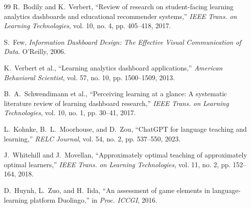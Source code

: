 \documentclass[11pt,a4paper]{article}
\begin{document}
\begin{thebibliography}{99}
R.~Bodily and K.~Verbert, ``Review of research on student-facing learning analytics dashboards and educational recommender systems,'' \emph{IEEE Trans. on Learning Technologies}, vol. 10, no. 4, pp. 405--418, 2017.

S.~Few, \emph{Information Dashboard Design: The Effective Visual Communication of Data}. O'Reilly, 2006.

K.~Verbert et al., ``Learning analytics dashboard applications,'' \emph{American Behavioral Scientist}, vol. 57, no. 10, pp. 1500--1509, 2013.

B.~A.~Schwendimann et al., ``Perceiving learning at a glance: A systematic literature review of learning dashboard research,'' \emph{IEEE Trans. on Learning Technologies}, vol. 10, no. 1, pp. 30--41, 2017.

L.~Kohnke, B.~L.~Moorhouse, and D.~Zou, ``ChatGPT for language teaching and learning,'' \emph{RELC Journal}, vol. 54, no. 2, pp. 537--550, 2023.

J.~Whitehill and J.~Movellan, ``Approximately optimal teaching of approximately optimal learners,'' \emph{IEEE Trans. on Learning Technologies}, vol. 11, no. 2, pp. 152--164, 2018.

D.~Huynh, L.~Zuo, and H.~Iida, ``An assessment of game elements in language-learning platform Duolingo,'' in \emph{Proc. ICCGI}, 2016.

\end{thebibliography}
\end{document}
